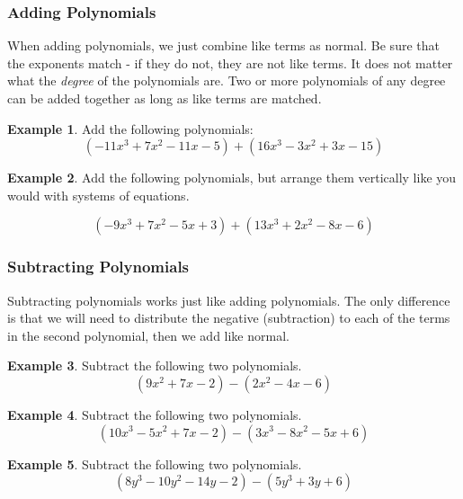 \documentclass[addpoints,12pt]{exam}
\theoremstyle{definition}
\theoremstyle{break}
\theoremstyle{break}
\newtheorem{example}{Example}[subsection]
\begin{document}
\newpage

\subsubsection*{Adding Polynomials}
\vspace{.15in}
When adding polynomials, we just combine like terms as normal. Be sure that the exponents match - if they do not, they are not like terms. It does not matter what the \emph{degree} of the polynomials are. Two or more polynomials of any degree can be added together as long as like terms are matched.
\vspace{.15in}

\begin{example}
Add the following polynomials:
\[(-11x^3 + 7x^2 - 11x - 5) + (16x^3 - 3x^2 + 3x - 15)\]
\vspace{1.5in}
\end{example}

\begin{example}
Add the following polynomials, but arrange them vertically like you would with systems of equations.

\[(-9x^3 + 7x^2 - 5x + 3) + (13x^3 + 2x^2 - 8x - 6)\]

\end{example}

\newpage

\subsubsection*{Subtracting Polynomials}
\vspace{.15in}
Subtracting polynomials works just like adding polynomials. The only difference is that we will need to distribute the negative (subtraction) to each of the terms in the second polynomial, then we add like normal.
\vspace{.15in}

\begin{example}
Subtract the following two polynomials.
\[(9x^2 + 7x - 2) - (2x^2 - 4x - 6)\]
\vspace{1.15in}
\end{example}

\begin{example}
Subtract the following two polynomials.
\[(10x^3 - 5x^2 + 7x - 2) - (3x^3 - 8x^2 - 5x + 6)\]
\vspace{1.15in}
\end{example}

\begin{example}
Subtract the following two polynomials.
\[(8y^3 - 10y^2 - 14y - 2) - (5y^3 + 3y + 6)\]
\end{example}
\end{document}
